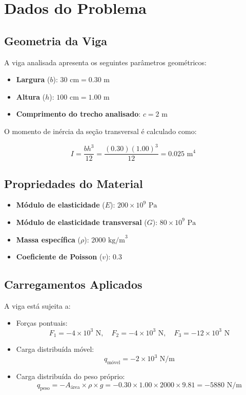 \newpage


\section{Dados do Problema}

\subsection{Geometria da Viga}
A viga analisada apresenta os seguintes parâmetros geométricos:
\begin{itemize}
    \item \textbf{Largura} (\( b \)): \(30 \text{ cm} = 0.30 \text{ m}\)
    \item \textbf{Altura} (\( h \)): \(100 \text{ cm} = 1.00 \text{ m}\)
    \item \textbf{Comprimento do trecho analisado}: \( c = 2 \text{ m}\)
\end{itemize}

O momento de inércia da seção transversal é calculado como:

\begin{equation}
    I = \frac{b h^3}{12} = \frac{(0.30)(1.00)^3}{12} = 0.025 \text{ m}^4
\end{equation}

\subsection{Propriedades do Material}
\begin{itemize}
    \item \textbf{Módulo de elasticidade} (\( E \)): \(200 \times 10^9 \text{ Pa}\)
    \item \textbf{Módulo de elasticidade transversal} (\( G \)): \(80 \times 10^9 \text{ Pa}\)
    \item \textbf{Massa específica} (\( \rho \)): \(2000 \text{ kg/m}^3\)
    \item \textbf{Coeficiente de Poisson} (\( v \)): 0.3
\end{itemize}

\subsection{Carregamentos Aplicados}
A viga está sujeita a:
\begin{itemize}
    \item Forças pontuais:
    \[
        F_1 = -4 \times 10^3 \text{ N}, \quad F_2 = -4 \times 10^3 \text{ N}, \quad F_3 = -12 \times 10^3 \text{ N}
    \]
    \item Carga distribuída móvel:
    \[
        q_{\text{móvel}} = -2 \times 10^3 \text{ N/m}
    \]
    \item Carga distribuída do peso próprio:
    \[
        q_{\text{peso}} = -A_{\text{área}} \times \rho \times g = -0.30 \times 1.00 \times 2000 \times 9.81 = -5880 \text{ N/m}
    \]
\end{itemize}



